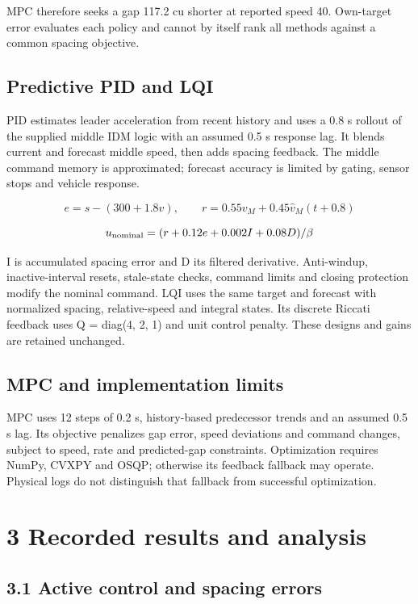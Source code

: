 \documentclass[11pt,a4paper]{article}
\begin{document}
MPC therefore seeks a gap 117.2 cu shorter at reported speed 40. Own-target error evaluates each policy and cannot by itself rank all methods against a common spacing objective.


\subsection*{Predictive PID and LQI}

PID estimates leader acceleration from recent history and uses a 0.8 s rollout of the supplied middle IDM logic with an assumed 0.5 s response lag. It blends current and forecast middle speed, then adds spacing feedback. The middle command memory is approximated; forecast accuracy is limited by gating, sensor stops and vehicle response.


\[
e=s-(300+1.8v),\qquad r=0.55v_M+0.45\widehat v_M(t+0.8)
\]

\[
u_{\rm nominal}=(r+0.12e+0.002I+0.08D)/\beta
\]

I is accumulated spacing error and D its filtered derivative. Anti-windup, inactive-interval resets, stale-state checks, command limits and closing protection modify the nominal command. LQI uses the same target and forecast with normalized spacing, relative-speed and integral states. Its discrete Riccati feedback uses Q = diag(4, 2, 1) and unit control penalty. These designs and gains are retained unchanged.


\subsection*{MPC and implementation limits}

MPC uses 12 steps of 0.2 s, history-based predecessor trends and an assumed 0.5 s lag. Its objective penalizes gap error, speed deviations and command changes, subject to speed, rate and predicted-gap constraints. Optimization requires NumPy, CVXPY and OSQP; otherwise its feedback fallback may operate. Physical logs do not distinguish that fallback from successful optimization.


\newpage

\section*{3 Recorded results and analysis}

\subsection*{3.1 Active control and spacing errors}
\end{document}
